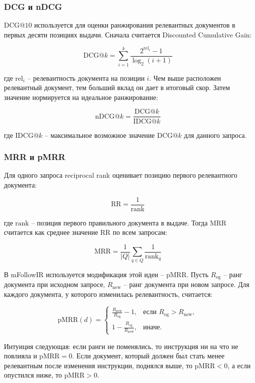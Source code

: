 \documentclass[12pt, a4paper, oneside]{article}
\begin{document}
\subsubsection{DCG и nDCG}

$\mathrm{DCG}@10$ используется для оценки ранжирования релевантных документов в первых десяти 
позициях выдачи. Сначала считается Discounted Cumulative Gain:

$$
\mathrm{DCG}@k = \sum_{i=1}^{k} \frac{2^{\mathrm{rel}_i} - 1}{\log_2(i + 1)}
$$

где $\mathrm{rel}_i$ -- релевантность документа на позиции $i$. Чем выше расположен 
релевантный документ, тем больший вклад он дает в итоговый скор. Затем значение 
нормируется на идеальное ранжирование:

$$
\mathrm{nDCG}@k = \frac{\mathrm{DCG}@k}{\mathrm{IDCG}@k}
$$

где $\mathrm{IDCG}@k$ -- максимальное возможное значение $\mathrm{DCG}@k$ для данного запроса. 

\subsubsection{MRR и pMRR}

Для одного запроса reciprocal rank оценивает позицию первого релевантного документа:

$$
\mathrm{RR} = \frac{1}{\mathrm{rank}}
$$

где $\mathrm{rank}$ -- позиция первого правильного документа в выдаче. Тогда $\mathrm{MRR}$ считается как среднее значение $\mathrm{RR}$ по всем запросам:

$$
\mathrm{MRR} = \frac{1}{|Q|} \sum_{q \in Q} \frac{1}{\mathrm{rank}_q}
$$

В mFollowIR используется модификация этой идеи -- $\mathrm{pMRR}$. Пусть $R_{\mathrm{og}}$ -- ранг документа при исходном запросе, 
$R_{\mathrm{new}}$ -- ранг документа при новом запросе. Для каждого документа, у которого изменилась релевантность, считается:

$$
    \mathrm{pMRR}(d) = 
    \begin{cases}
    \frac{R_{\mathrm{new}}}{R_{\mathrm{og}}} - 1, & \text{если } R_{\mathrm{og}} > R_{\mathrm{new}}, \\
    1 - \frac{R_{\mathrm{og}}}{R_{\mathrm{new}}}, & \text{иначе.}
    \end{cases}
$$

Интуиция следующая: если ранги не поменялись, то инструкция ни на что не повлияла и 
$\mathrm{pMRR} = 0$. Если документ, который должен был стать менее релевантным после изменения инструкции, 
поднялся выше, то $\mathrm{pMRR} < 0$, а если опустился ниже, то $\mathrm{pMRR} > 0$.
\end{document}
